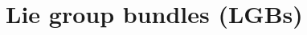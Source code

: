 \documentclass[a4paper,oneside,11pt,bibliography=totoc]{scrartcl}
\def\ba#1\ea{\begin{align}#1\end{align}}
\theoremstyle{plain}
\theoremstyle{remark}
\theoremstyle{definition}
\begin{document}
%
%

\section{Lie group bundles (LGBs)}
\end{document}
